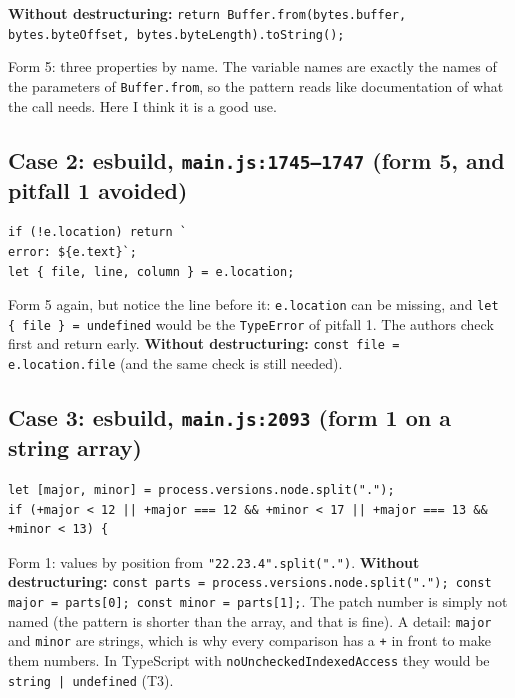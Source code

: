 \documentclass[
  10pt,
]{article}
\begin{document}
\textbf{Without destructuring:}
\texttt{return Buffer.\allowbreak{}from(\allowbreak{}bytes.\allowbreak{}buffer,\allowbreak{} bytes.\allowbreak{}byteOffset,\allowbreak{} bytes.\allowbreak{}byteLength).\allowbreak{}toString(\allowbreak{});}

Form 5: three properties by name. The variable names are exactly the
names of the parameters of \texttt{Buffer.\allowbreak{}from}, so the
pattern reads like documentation of what the call needs. Here I think it
is a good use.

\hypertarget{case-2-esbuild-mainjs17451747-form-5-and-pitfall-1-avoided}{%
\subsection{\texorpdfstring{Case 2: esbuild,
\texttt{main.\allowbreak{}js:\allowbreak{}1745–1747} (form 5, and
pitfall 1
avoided)}{Case 2: esbuild,  (form 5, and pitfall 1 avoided)}}\label{case-2-esbuild-mainjs17451747-form-5-and-pitfall-1-avoided}}

\begin{verbatim}
if (!e.location) return `
error: ${e.text}`;
let { file, line, column } = e.location;
\end{verbatim}

Form 5 again, but notice the line before it:
\texttt{e.\allowbreak{}location} can be missing, and
\texttt{let \{ file \} =\allowbreak{} undefined} would be the
\texttt{TypeError} of pitfall 1. The authors check first and return
early. \textbf{Without destructuring:}
\texttt{const file =\allowbreak{} e.\allowbreak{}location.\allowbreak{}file}
(and the same check is still needed).

\hypertarget{case-3-esbuild-mainjs2093-form-1-on-a-string-array}{%
\subsection{\texorpdfstring{Case 3: esbuild,
\texttt{main.\allowbreak{}js:\allowbreak{}2093} (form 1 on a string
array)}{Case 3: esbuild,  (form 1 on a string array)}}\label{case-3-esbuild-mainjs2093-form-1-on-a-string-array}}

\begin{verbatim}
let [major, minor] = process.versions.node.split(".");
if (+major < 12 || +major === 12 && +minor < 17 || +major === 13 && +minor < 13) {
\end{verbatim}

Form 1: values by position from
\texttt{"22.\allowbreak{}23.\allowbreak{}4".\allowbreak{}split(\allowbreak{}".\allowbreak{}")}.
\textbf{Without destructuring:}
\texttt{const parts =\allowbreak{} process.\allowbreak{}versions.\allowbreak{}node.\allowbreak{}split(\allowbreak{}".\allowbreak{}"); const major =\allowbreak{} parts[\allowbreak{}0]; const minor =\allowbreak{} parts[\allowbreak{}1];}.
The patch number is simply not named (the pattern is shorter than the
array, and that is fine). A detail: \texttt{major} and \texttt{minor}
are strings, which is why every comparison has a \texttt{+} in front to
make them numbers. In TypeScript with \texttt{noUncheckedIndexedAccess}
they would be \texttt{string |\allowbreak{} undefined} (T3).
\end{document}
